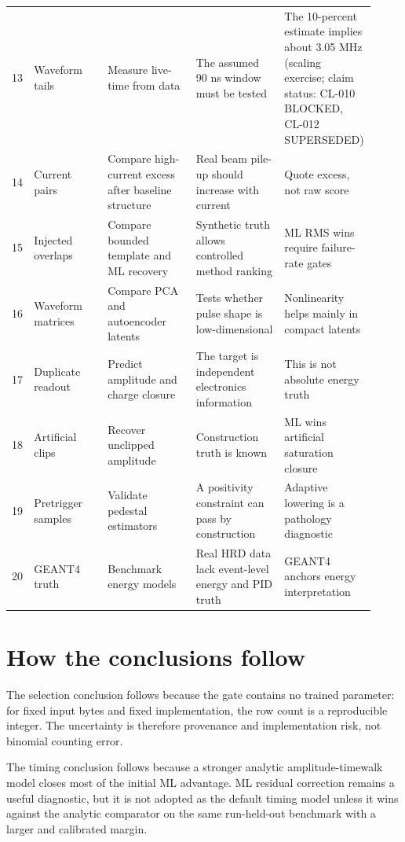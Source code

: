 \begin{longtable}{@{}p{0.06\linewidth}p{0.20\linewidth}p{0.24\linewidth}p{0.24\linewidth}p{0.18\linewidth}@{}}
13 & Waveform tails & Measure live-time from data & The assumed 90 ns window must be tested & The 10-percent estimate implies about 3.05 MHz (scaling exercise; claim status: CL-010 BLOCKED, CL-012 SUPERSEDED) \\
14 & Current pairs & Compare high-current excess after baseline structure & Real beam pile-up should increase with current & Quote excess, not raw score \\
15 & Injected overlaps & Compare bounded template and ML recovery & Synthetic truth allows controlled method ranking & ML RMS wins require failure-rate gates \\
16 & Waveform matrices & Compare PCA and autoencoder latents & Tests whether pulse shape is low-dimensional & Nonlinearity helps mainly in compact latents \\
17 & Duplicate readout & Predict amplitude and charge closure & The target is independent electronics information & This is not absolute energy truth \\
18 & Artificial clips & Recover unclipped amplitude & Construction truth is known & ML wins artificial saturation closure \\
19 & Pretrigger samples & Validate pedestal estimators & A positivity constraint can pass by construction & Adaptive lowering is a pathology diagnostic \\
20 & GEANT4 truth & Benchmark energy models & Real HRD data lack event-level energy and PID truth & GEANT4 anchors energy interpretation \\
\bottomrule
\end{longtable}

\section{How the conclusions follow}

The selection conclusion follows because the gate contains no trained parameter:
for fixed input bytes and fixed implementation, the row count is a reproducible
integer.  The uncertainty is therefore provenance and implementation risk, not
binomial counting error.

The timing conclusion follows because a stronger analytic amplitude-timewalk
model closes most of the initial ML advantage.  ML residual correction remains a
useful diagnostic, but it is not adopted as the default timing model unless it
wins against the analytic comparator on the same run-held-out benchmark with a
larger and calibrated margin.

